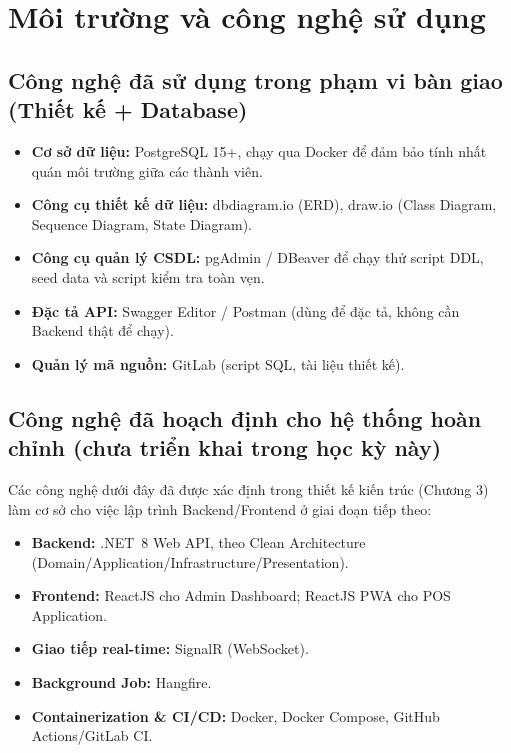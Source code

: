 \section{Môi trường và công nghệ sử dụng}

\subsection{Công nghệ đã sử dụng trong phạm vi bàn giao (Thiết kế + Database)}
\begin{itemize}
    \item \textbf{Cơ sở dữ liệu:} PostgreSQL 15+, chạy qua Docker để đảm bảo tính nhất quán môi trường giữa các thành viên.
    \item \textbf{Công cụ thiết kế dữ liệu:} dbdiagram.io (ERD), draw.io (Class Diagram, Sequence Diagram, State Diagram).
    \item \textbf{Công cụ quản lý CSDL:} pgAdmin / DBeaver để chạy thử script DDL, seed data và script kiểm tra toàn vẹn.
    \item \textbf{Đặc tả API:} Swagger Editor / Postman (dùng để đặc tả, không cần Backend thật để chạy).
    \item \textbf{Quản lý mã nguồn:} GitLab (script SQL, tài liệu thiết kế).
\end{itemize}

\subsection{Công nghệ đã hoạch định cho hệ thống hoàn chỉnh (chưa triển khai trong học kỳ này)}
Các công nghệ dưới đây đã được xác định trong thiết kế kiến trúc (Chương 3) làm cơ sở cho việc lập trình Backend/Frontend ở giai đoạn tiếp theo:
\begin{itemize}
    \item \textbf{Backend:} .NET~8 Web API, theo Clean Architecture (Domain/Application/Infrastructure/Presentation).
    \item \textbf{Frontend:} ReactJS cho Admin Dashboard; ReactJS PWA cho POS Application.
    \item \textbf{Giao tiếp real-time:} SignalR (WebSocket).
    \item \textbf{Background Job:} Hangfire.
    \item \textbf{Containerization \& CI/CD:} Docker, Docker Compose, GitHub Actions/GitLab CI.
\end{itemize}

